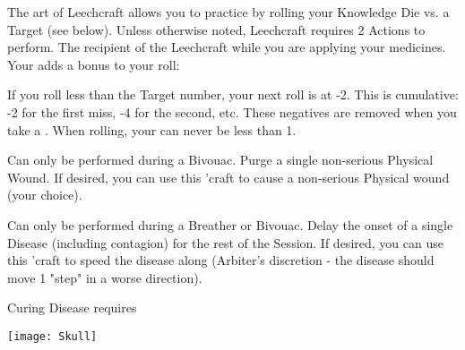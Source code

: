     \newpage





    The art of Leechcraft allows you to practice  by rolling your Knowledge Die vs. a Target (see below).  Unless otherwise noted, Leechcraft requires 2 Actions to perform.  The recipient of the Leechcraft  while you are applying your medicines.  Your \INT adds a bonus to your roll:

   
  If you roll less than the Target number, your next roll is at -2.  This is cumulative:  -2 for the first miss, -4 for the second, etc.  These negatives are removed when you take a . When rolling, your \SUMDICE can never be less than 1.

  


  


  \LEECHCRAFT[
    Name=Bonesetting,
    Link=leechcraft-bonesetting,
    Target=9,
    Keywords=Purge,
    Reversible=Y
  ]

  Can only be performed during a Bivouac.  Purge a single non-serious Physical Wound.  If desired, you can use this 'craft to cause a non-serious Physical wound (your choice).  

  \LEECHCRAFT[
    Name=Delay Infection,
    Link=leechcraft-delay-infection,
    Target=7,
    Keywords=None,
    Reversible=Y 
  ]
  
  Can only be performed during a Breather or Bivouac.  Delay the onset of a single Disease (including contagion) for the rest of the Session.  If desired, you can use this 'craft to speed the disease along (Arbiter's discretion - the disease should move 1 "step" in a worse direction).

  Curing Disease requires 

  \begin{center}
  \texttt{[image: Skull]}
  \end{center}


